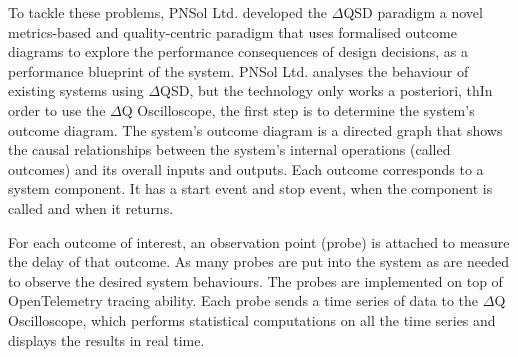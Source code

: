     To tackle these problems, PNSol Ltd. developed the $\Delta$QSD paradigm a novel metrics-based and quality-centric paradigm that uses formalised outcome diagrams to explore the performance consequences of design decisions, as a performance blueprint of the system. PNSol Ltd. analyses the behaviour of existing systems using $\Delta$QSD, but the technology only works a posteriori, thIn order to use the $\Delta$Q Oscilloscope, the first step is to determine the system's outcome diagram. The system's outcome diagram is a directed graph that shows the causal relationships between the system's internal operations (called outcomes) and its overall inputs and outputs. Each outcome corresponds to a system component. It has a start event and stop event, when the component is called and when it returns.

For each outcome of interest, an observation point (probe) is attached to measure the delay of that outcome. As many probes are put into the system as are needed to observe the desired system behaviours. The probes are implemented on top of OpenTelemetry tracing ability. Each probe sends a time series of data to the $\Delta$Q Oscilloscope, which performs statistical computations on all the time series and displays the results in real time.
\fi
